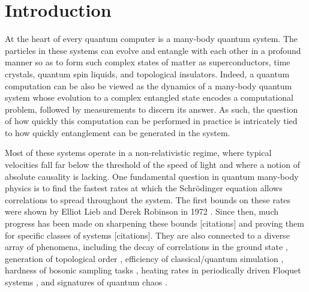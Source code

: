 \chapter{Introduction}


At the heart of every quantum computer is a many-body quantum system.
The particles in these systems can evolve and entangle with each other in a profound manner so as to form such complex states of matter as superconductors, time crystals, quantum spin liquids, and topological insulators.
Indeed, a quantum computation can be also be viewed as the dynamics of a many-body quantum system whose evolution to a complex entangled state encodes a computational problem, followed by measurements to discern its answer.
As such, the question of how quickly this computation can be performed in practice is intricately tied to how quickly entanglement can be generated in the system.

Most of these systems operate in a non-relativistic regime, where typical velocities fall far below the threshold of the speed of light and where a notion of absolute causality is lacking.
One fundamental question in quantum many-body physics is to find the fastest rates at which the Schr\"odinger equation allows correlations to spread throughout the system.
The first bounds on these rates were shown by Elliot Lieb and Derek Robinson in 1972 \cite{LR}.
Since then, much progress has been made on sharpening these bounds [citations] and proving them for specific classes of systems [citations].
They are also connected to a diverse array of phenomena, including the decay of correlations in the ground state \cite{Hastings2006}, generation of topological order \cite{Bravyi2006, Bravyi2010}, efficiency of classical/quantum simulation \cite{Osborne2006,Tran2019a}, hardness of bosonic sampling tasks \cite{Deshpande2018}, heating rates in periodically driven Floquet systems \cite{Abanin2015,Tran2019b}, and signatures of quantum chaos \cite{Lashkari2013,Guo2019}.





